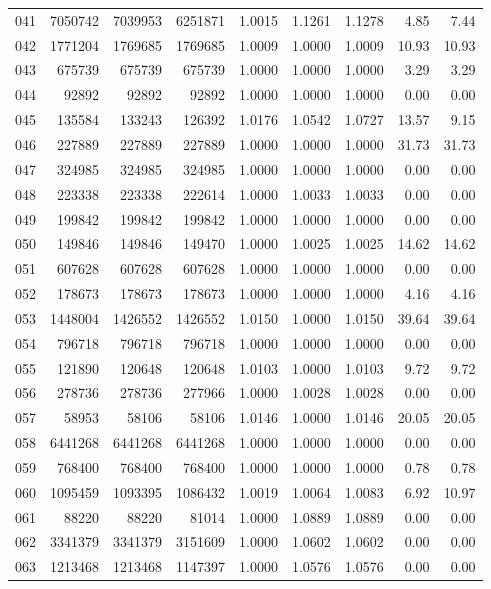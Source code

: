 \begin{longtable}{crrrrrrrr}
041 & 7050742 & 7039953 & 6251871 & 1.0015 & 1.1261 & 1.1278 & 4.85 & 7.44 \\
042 & 1771204 & 1769685 & 1769685 & 1.0009 & 1.0000 & 1.0009 & 10.93 & 10.93 \\
043 & 675739 & 675739 & 675739 & 1.0000 & 1.0000 & 1.0000 & 3.29 & 3.29 \\
044 & 92892 & 92892 & 92892 & 1.0000 & 1.0000 & 1.0000 & 0.00 & 0.00 \\
045 & 135584 & 133243 & 126392 & 1.0176 & 1.0542 & 1.0727 & 13.57 & 9.15 \\
046 & 227889 & 227889 & 227889 & 1.0000 & 1.0000 & 1.0000 & 31.73 & 31.73 \\
047 & 324985 & 324985 & 324985 & 1.0000 & 1.0000 & 1.0000 & 0.00 & 0.00 \\
048 & 223338 & 223338 & 222614 & 1.0000 & 1.0033 & 1.0033 & 0.00 & 0.00 \\
049 & 199842 & 199842 & 199842 & 1.0000 & 1.0000 & 1.0000 & 0.00 & 0.00 \\
050 & 149846 & 149846 & 149470 & 1.0000 & 1.0025 & 1.0025 & 14.62 & 14.62 \\
051 & 607628 & 607628 & 607628 & 1.0000 & 1.0000 & 1.0000 & 0.00 & 0.00 \\
052 & 178673 & 178673 & 178673 & 1.0000 & 1.0000 & 1.0000 & 4.16 & 4.16 \\
053 & 1448004 & 1426552 & 1426552 & 1.0150 & 1.0000 & 1.0150 & 39.64 & 39.64 \\
054 & 796718 & 796718 & 796718 & 1.0000 & 1.0000 & 1.0000 & 0.00 & 0.00 \\
055 & 121890 & 120648 & 120648 & 1.0103 & 1.0000 & 1.0103 & 9.72 & 9.72 \\
056 & 278736 & 278736 & 277966 & 1.0000 & 1.0028 & 1.0028 & 0.00 & 0.00 \\
057 & 58953 & 58106 & 58106 & 1.0146 & 1.0000 & 1.0146 & 20.05 & 20.05 \\
058 & 6441268 & 6441268 & 6441268 & 1.0000 & 1.0000 & 1.0000 & 0.00 & 0.00 \\
059 & 768400 & 768400 & 768400 & 1.0000 & 1.0000 & 1.0000 & 0.78 & 0.78 \\
060 & 1095459 & 1093395 & 1086432 & 1.0019 & 1.0064 & 1.0083 & 6.92 & 10.97 \\
061 & 88220 & 88220 & 81014 & 1.0000 & 1.0889 & 1.0889 & 0.00 & 0.00 \\
062 & 3341379 & 3341379 & 3151609 & 1.0000 & 1.0602 & 1.0602 & 0.00 & 0.00 \\
063 & 1213468 & 1213468 & 1147397 & 1.0000 & 1.0576 & 1.0576 & 0.00 & 0.00 \\

\end{longtable}
